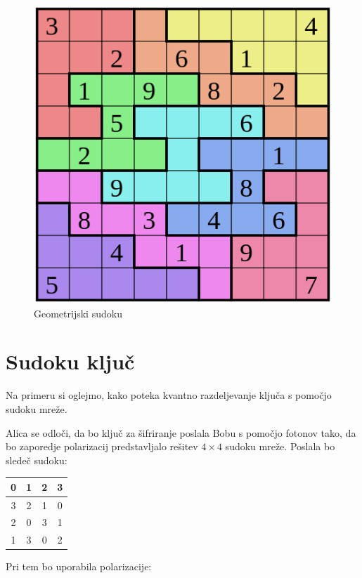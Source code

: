 \documentclass[A4paper, 11pt]{article}
\begin{document}
\begin{figure}[h]
\centering
\caption{Geometrijski sudoku}
\includegraphics[scale=0.4]{geo_sudoku}
\end{figure}


\section{Sudoku ključ} \label{sudoku-kljuc}

Na primeru si oglejmo, kako poteka kvantno razdeljevanje ključa s pomočjo sudoku mreže.

Alica se odloči, da bo ključ za šifriranje poslala Bobu s pomočjo fotonov tako, da bo zaporedje polarizacij predstavljalo rešitev $4\times4$ sudoku mreže. Poslala bo sledeč sudoku:

\begin{center}
\begin{tabular}{| c | c || c | c |}
\hline
0 & 1 & 2 & 3\\
\hline
3 & 2 & 1 & 0\\
\hline
\hline
2 & 0 & 3 & 1\\
\hline
1 & 3 & 0 & 2\\
\hline
\end{tabular}
\end{center}

Pri tem bo uporabila polarizacije:
\end{document}
